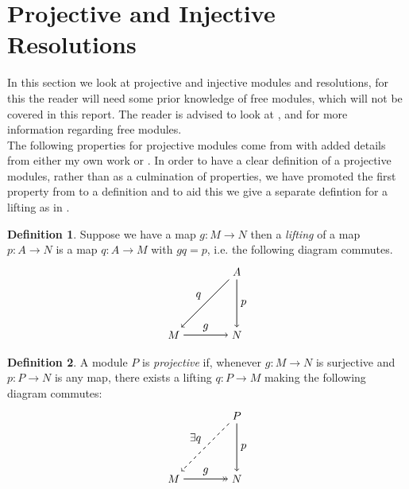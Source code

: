 \documentclass[11.5pt, twoside, a4paper, titlepage]{report}
\theoremstyle{definition}
\newtheorem{mydef}{Definition}[section]
\theoremstyle{plain}
\begin{document}
\section{Projective and Injective Resolutions}

In this section we look at projective and injective modules and resolutions, for this the reader will need some prior knowledge of free modules, which will not be covered in this report. The reader is advised to look at \cite{Stamm}, \cite{Weibel} and \cite{Rotman} for more information regarding free modules.\\
The following properties for projective modules come from \cite{CB1} with added details from either my own work or \cite{Rotman}. In order to have a clear definition of a projective modules, rather than as a culmination of properties, we have promoted the first property from \cite{CB1} to a definition and to aid this we give a separate defintion for a lifting as in \cite{Rotman}.

\begin{mydef}
Suppose we have a map $g:M \to N$ then a \emph{lifting} of a map $p:A \to N$ is a map $q:A\to M$ with $gq=p$, i.e. the following diagram commutes.
\begin{equation*}
\begin{tikzpicture}[->,-latex, auto, main path/.style={->, semithick}, main node/.style={}]
\node	[main node]		(1) at (0,0)		{$M$};
\node	[main node]		(2) at (2,0)		{$N$};
\node [main node]		(3) at (2,2)		{$A$};

\draw (1) edge [main path] node [auto] {$g$} (2);
\draw (3) edge [main path] node [auto] {$p$} (2);
\draw (3) edge [main path] node [auto, swap] {$q$} (1);
\end{tikzpicture}
\end{equation*}
\end{mydef}

\begin{mydef}
A module $P$ is \emph{projective} if, whenever $g:M\to N$ is surjective and $p:P\to N$ is any map, there exists a lifting $q:P \to M$ making the following diagram commutes:
\begin{equation*}
\begin{tikzpicture}[->,-latex, auto, main path/.style={->, semithick}, main node/.style={}]
\node	[main node]		(1) at (0,0)		{$M$};
\node	[main node]		(2) at (2,0)		{$N$};
\node [main node]		(3) at (2,2)		{$P$};

\draw (1) edge [->>, semithick] node [auto] {$g$} (2);
\draw (3) edge [main path] node [auto] {$p$} (2);
\draw (3) edge [dashed, ->, semithick] node [auto, swap] {$\exists q$} (1);
\end{tikzpicture}
\end{equation*}
\end{mydef}
\end{document}
